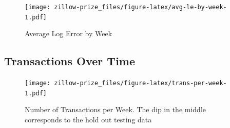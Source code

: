 \documentclass[]{book}
\newenvironment{Shaded}{\begin{snugshade}}{\end{snugshade}}
\newcommand{\KeywordTok}[1]{\textcolor[rgb]{0.13,0.29,0.53}{\textbf{#1}}}
\newcommand{\DataTypeTok}[1]{\textcolor[rgb]{0.13,0.29,0.53}{#1}}
\newcommand{\DecValTok}[1]{\textcolor[rgb]{0.00,0.00,0.81}{#1}}
\newcommand{\FloatTok}[1]{\textcolor[rgb]{0.00,0.00,0.81}{#1}}
\newcommand{\StringTok}[1]{\textcolor[rgb]{0.31,0.60,0.02}{#1}}
\newcommand{\OperatorTok}[1]{\textcolor[rgb]{0.81,0.36,0.00}{\textbf{#1}}}
\newcommand{\NormalTok}[1]{#1}
\theoremstyle{definition}
\theoremstyle{definition}
\theoremstyle{definition}
\theoremstyle{remark}
\begin{document}
\begin{figure}
\centering
\texttt{[image: zillow-prize\_files/figure-latex/avg-le-by-week-1.pdf]}
\caption{\label{fig:avg-le-by-week}Average Log Error by Week}
\end{figure}

\subsection{Transactions Over Time}\label{transactions-over-time}

\begin{Shaded}
\end{Shaded}

\begin{figure}
\centering
\texttt{[image: zillow-prize\_files/figure-latex/trans-per-week-1.pdf]}
\caption{\label{fig:trans-per-week}Number of Transactions per Week. The dip
in the middle corresponds to the hold out testing data}
\end{figure}

\begin{Shaded}
\end{Shaded}
\end{document}
